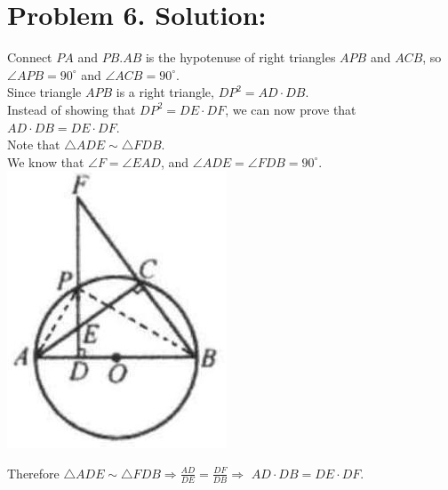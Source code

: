 \documentclass[10pt]{article}
\begin{document}
\section*{Problem 6. Solution:}
Connect \(P A\) and \(P B . A B\) is the hypotenuse of right triangles \(A P B\) and \(A C B\), so \(\angle A P B=90^{\circ}\) and \(\angle A C B=90^{\circ}\).\\
Since triangle \(A P B\) is a right triangle, \(D P^{2}=A D \cdot D B\).\\
Instead of showing that \(D P^{2}=D E \cdot D F\), we can now prove that \(A D \cdot D B=D E \cdot D F\).\\
Note that \(\triangle A D E \sim \triangle F D B\).\\
We know that \(\angle F=\angle E A D\), and \(\angle A D E=\angle F D B=90^{\circ}\).\\
\includegraphics[max width=\textwidth, center]{2025_04_17_97bc1f7e44d93c271a88g-173(1)}

Therefore \(\triangle A D E \sim \triangle F D B \Rightarrow \frac{A D}{D E}=\frac{D F}{D B} \Rightarrow\) \(A D \cdot D B=D E \cdot D F\).
\end{document}
